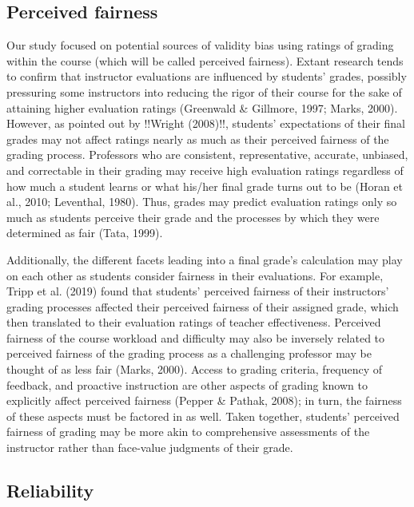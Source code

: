 \documentclass[
  man]{apa7}
\begin{document}
\hypertarget{perceived-fairness}{%
\subsection{Perceived fairness}\label{perceived-fairness}}

Our study focused on potential sources of validity bias using ratings of
grading within the course (which will be called perceived fairness).
Extant research tends to confirm that instructor evaluations are
influenced by students' grades, possibly pressuring some instructors
into reducing the rigor of their course for the sake of attaining higher
evaluation ratings (Greenwald \& Gillmore, 1997; Marks, 2000). However, as pointed out
by !!Wright (2008)!!, students' expectations of their final grades may
not affect ratings nearly as much as their perceived fairness of the
grading process. Professors who are consistent, representative,
accurate, unbiased, and correctable in their grading may receive high
evaluation ratings regardless of how much a student learns or what
his/her final grade turns out to be (Horan et al., 2010; Leventhal, 1980). Thus,
grades may predict evaluation ratings only so much as students perceive
their grade and the processes by which they were determined as fair
(Tata, 1999).

Additionally, the different facets leading into a final grade's
calculation may play on each other as students consider fairness in
their evaluations. For example, Tripp et al. (2019) found that students'
perceived fairness of their instructors' grading processes affected
their perceived fairness of their assigned grade, which then translated
to their evaluation ratings of teacher effectiveness. Perceived fairness
of the course workload and difficulty may also be inversely related to
perceived fairness of the grading process as a challenging professor may
be thought of as less fair (Marks, 2000). Access to grading criteria,
frequency of feedback, and proactive instruction are other aspects of
grading known to explicitly affect perceived fairness (Pepper \& Pathak, 2008); in
turn, the fairness of these aspects must be factored in as well. Taken
together, students' perceived fairness of grading may be more akin to
comprehensive assessments of the instructor rather than face-value
judgments of their grade.

\hypertarget{reliability}{%
\subsection{Reliability}\label{reliability}}
\end{document}

